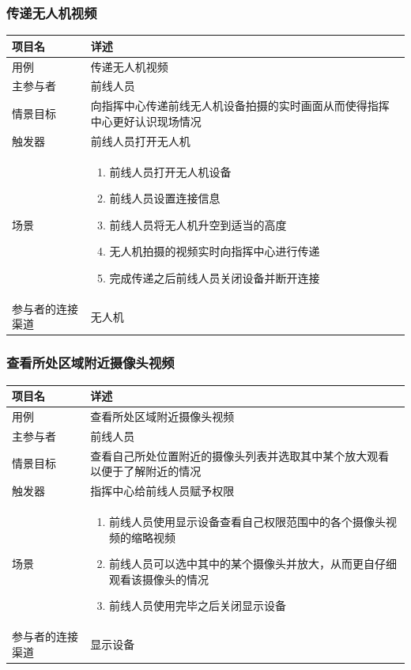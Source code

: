 \documentclass{ctexrep}
\begin{document}
\subsubsection{传递无人机视频}
\begin{longtable}{p{2cm} | p{10cm}}
\hline
项目名 & 详述 \\
\hline
\hline
用例 & 传递无人机视频 \\
\hline
主参与者 & 前线人员  \\
\hline
情景目标 & 向指挥中心传递前线无人机设备拍摄的实时画面从而使得指挥中心更好认识现场情况  \\
\hline
触发器 & 前线人员打开无人机 \\
\hline
场景 & \begin{enumerate}
	\item 前线人员打开无人机设备
	\item 前线人员设置连接信息
	\item 前线人员将无人机升空到适当的高度
	\item 无人机拍摄的视频实时向指挥中心进行传递
	\item 完成传递之后前线人员关闭设备并断开连接
\end{enumerate} \\
\hline
参与者的连接渠道 &  无人机\\
\hline
\end{longtable}

\subsubsection{查看所处区域附近摄像头视频}
\begin{longtable}{p{2cm} | p{10cm}}
\hline
项目名 & 详述 \\
\hline
\hline
用例 & 查看所处区域附近摄像头视频 \\
\hline
主参与者 & 前线人员  \\
\hline
情景目标 & 查看自己所处位置附近的摄像头列表并选取其中某个放大观看以便于了解附近的情况  \\
\hline
触发器 & 指挥中心给前线人员赋予权限 \\
\hline
场景 & \begin{enumerate}
	\item 前线人员使用显示设备查看自己权限范围中的各个摄像头视频的缩略视频
	\item 前线人员可以选中其中的某个摄像头并放大，从而更自仔细观看该摄像头的情况
	\item 前线人员使用完毕之后关闭显示设备
\end{enumerate} \\
\hline
参与者的连接渠道 & 显示设备 \\
\hline
\end{longtable}
\end{document}
